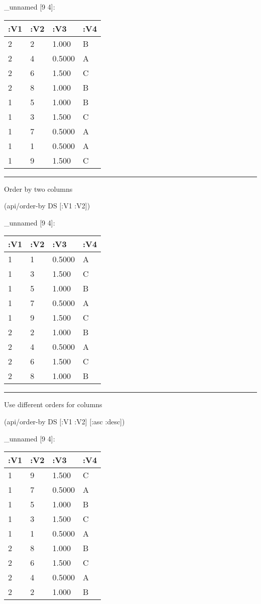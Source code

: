 \documentclass[]{article}
\newenvironment{Shaded}{\begin{snugshade}}{\end{snugshade}}
\newcommand{\AttributeTok}[1]{\textcolor[rgb]{0.77,0.63,0.00}{#1}}
\newcommand{\NormalTok}[1]{#1}
\begin{document}
\_unnamed {[}9 4{]}:

\begin{longtable}[]{@{}llll@{}}
\toprule
:V1 & :V2 & :V3 & :V4\tabularnewline
\midrule
\endhead
2 & 2 & 1.000 & B\tabularnewline
2 & 4 & 0.5000 & A\tabularnewline
2 & 6 & 1.500 & C\tabularnewline
2 & 8 & 1.000 & B\tabularnewline
1 & 5 & 1.000 & B\tabularnewline
1 & 3 & 1.500 & C\tabularnewline
1 & 7 & 0.5000 & A\tabularnewline
1 & 1 & 0.5000 & A\tabularnewline
1 & 9 & 1.500 & C\tabularnewline
\bottomrule
\end{longtable}

\begin{center}\rule{0.5\linewidth}{0.5pt}\end{center}

Order by two columns

\begin{Shaded}
\begin{Highlighting}[]
\NormalTok{(api/order-by DS [}\AttributeTok{:V1} \AttributeTok{:V2}\NormalTok{])}
\end{Highlighting}
\end{Shaded}

\_unnamed {[}9 4{]}:

\begin{longtable}[]{@{}llll@{}}
\toprule
:V1 & :V2 & :V3 & :V4\tabularnewline
\midrule
\endhead
1 & 1 & 0.5000 & A\tabularnewline
1 & 3 & 1.500 & C\tabularnewline
1 & 5 & 1.000 & B\tabularnewline
1 & 7 & 0.5000 & A\tabularnewline
1 & 9 & 1.500 & C\tabularnewline
2 & 2 & 1.000 & B\tabularnewline
2 & 4 & 0.5000 & A\tabularnewline
2 & 6 & 1.500 & C\tabularnewline
2 & 8 & 1.000 & B\tabularnewline
\bottomrule
\end{longtable}

\begin{center}\rule{0.5\linewidth}{0.5pt}\end{center}

Use different orders for columns

\begin{Shaded}
\begin{Highlighting}[]
\NormalTok{(api/order-by DS [}\AttributeTok{:V1} \AttributeTok{:V2}\NormalTok{] [}\AttributeTok{:asc} \AttributeTok{:desc}\NormalTok{])}
\end{Highlighting}
\end{Shaded}

\_unnamed {[}9 4{]}:

\begin{longtable}[]{@{}llll@{}}
\toprule
:V1 & :V2 & :V3 & :V4\tabularnewline
\midrule
\endhead
1 & 9 & 1.500 & C\tabularnewline
1 & 7 & 0.5000 & A\tabularnewline
1 & 5 & 1.000 & B\tabularnewline
1 & 3 & 1.500 & C\tabularnewline
1 & 1 & 0.5000 & A\tabularnewline
2 & 8 & 1.000 & B\tabularnewline
2 & 6 & 1.500 & C\tabularnewline
2 & 4 & 0.5000 & A\tabularnewline
2 & 2 & 1.000 & B\tabularnewline
\bottomrule
\end{longtable}
\end{document}
